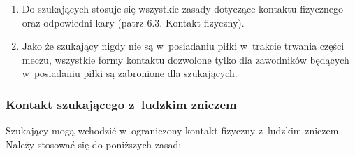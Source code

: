 \documentclass[12pt]{article}
\begin{document}
\begin{enumerate}
	\item
	      Do szukających stosuje się wszystkie zasady dotyczące kontaktu
	      fizycznego oraz odpowiedni kary (patrz 6.3. Kontakt fizyczny).
	\item
	      Jako że szukający nigdy nie są w~posiadaniu piłki w~trakcie trwania
	      części meczu, wszystkie formy kontaktu dozwolone tylko dla zawodników
	      będących w~posiadaniu piłki są zabronione dla szukających.
\end{enumerate}

\subsubsection{Kontakt szukającego z~ludzkim zniczem}

Szukający mogą wchodzić w~ograniczony kontakt fizyczny z~ludzkim
zniczem. Należy stosować się do poniższych zasad:
\end{document}
